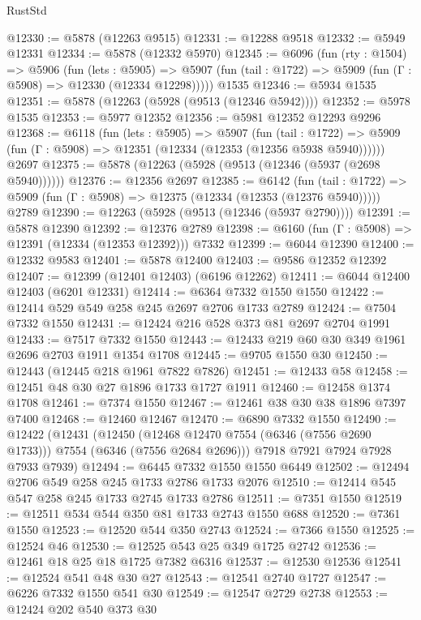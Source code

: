 \begin{lexlean}{RustStd}
\begin{coremodule}
@12330 := @5878 (@12263 @9515)
@12331 := @12288 @9518
@12332 := @5949 @12331
@12334 := @5878 (@12332 @5970)
@12345 := @6096
    (fun (rty : @1504) =>
    @5906
      (fun (lets : @5905) =>
      @5907 (fun (tail : @1722) => @5909 (fun (Γ : @5908) => @12330 (@12334 @12298)))))
    @1535
@12346 := @5934 @1535
@12351 := @5878 (@12263 (@5928 (@9513 (@12346 @5942))))
@12352 := @5978 @1535
@12353 := @5977 @12352
@12356 := @5981 @12352 @12293 @9296
@12368 := @6118
    (fun (lets : @5905) =>
    @5907
      (fun (tail : @1722) =>
      @5909 (fun (Γ : @5908) => @12351 (@12334 (@12353 (@12356 @5938 @5940))))))
    @2697
@12375 := @5878 (@12263 (@5928 (@9513 (@12346 (@5937 (@2698 @5940))))))
@12376 := @12356 @2697
@12385 := @6142
    (fun (tail : @1722) => @5909 (fun (Γ : @5908) => @12375 (@12334 (@12353 (@12376 @5940)))))
    @2789
@12390 := @12263 (@5928 (@9513 (@12346 (@5937 @2790))))
@12391 := @5878 @12390
@12392 := @12376 @2789
@12398 := @6160 (fun (Γ : @5908) => @12391 (@12334 (@12353 @12392))) @7332
@12399 := @6044 @12390
@12400 := @12332 @9583
@12401 := @5878 @12400
@12403 := @9586 @12352 @12392
@12407 := @12399 (@12401 @12403) (@6196 @12262)
@12411 := @6044 @12400 @12403 (@6201 @12331)
@12414 := @6364 @7332 @1550 @1550
@12422 := @12414 @529 @549 @258 @245 @2697 @2706 @1733 @2789
@12424 := @7504 @7332 @1550
@12431 := @12424 @216 @528 @373 @81 @2697 @2704 @1991
@12433 := @7517 @7332 @1550
@12443 := @12433 @219 @60 @30 @349 @1961 @2696 @2703 @1911 @1354 @1708
@12445 := @9705 @1550 @30
@12450 := @12443 (@12445 @218 @1961 @7822 @7826)
@12451 := @12433 @58
@12458 := @12451 @48 @30 @27 @1896 @1733 @1727 @1911
@12460 := @12458 @1374 @1708
@12461 := @7374 @1550
@12467 := @12461 @38 @30 @38 @1896 @7397 @7400
@12468 := @12460 @12467
@12470 := @6890 @7332 @1550
@12490 := @12422
    (@12431
      (@12450 (@12468 @12470 @7554 (@6346 (@7556 @2690 @1733))) @7554 (@6346 (@7556 @2684 @2696)))
      @7918
      @7921
      @7924
      @7928
      @7933
      @7939)
@12494 := @6445 @7332 @1550 @1550 @6449
@12502 := @12494 @2706 @549 @258 @245 @1733 @2786 @1733 @2076
@12510 := @12414 @545 @547 @258 @245 @1733 @2745 @1733 @2786
@12511 := @7351 @1550
@12519 := @12511 @534 @544 @350 @81 @1733 @2743 @1550 @688
@12520 := @7361 @1550
@12523 := @12520 @544 @350 @2743
@12524 := @7366 @1550
@12525 := @12524 @46
@12530 := @12525 @543 @25 @349 @1725 @2742
@12536 := @12461 @18 @25 @18 @1725 @7382 @6316
@12537 := @12530 @12536
@12541 := @12524 @541 @48 @30 @27
@12543 := @12541 @2740 @1727
@12547 := @6226 @7332 @1550 @541 @30
@12549 := @12547 @2729 @2738
@12553 := @12424 @202 @540 @373 @30

\end{coremodule}
\end{lexlean}
